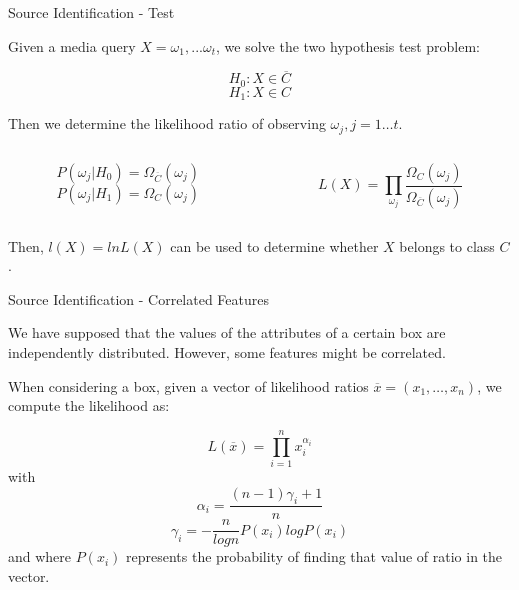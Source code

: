 \begin{tframe}{Source Identification - Test}

Given a media query $X = \omega_{1}, . . . \omega_{t}$, we solve the two hypothesis test problem:

$$  H_{0}:X \in \overline{C} $$
$$  H_{1}:X \in C $$

Then we determine the likelihood ratio of observing $\omega_{j}, j = 1 \ldots t$.

\vspace{1cm}

\begin{minipage}{\textwidth}
\begin{columns}[T]

\begin{column}{0.45\textwidth}
$$ P(\omega_{j}\vert H_{0}) = \Omega_{\overline{C}}(\omega_{j}) $$
$$ P(\omega_{j}\vert H_{1}) = \Omega_{C}(\omega_{j}) $$ 
\end{column}

\begin{column}{0.45\textwidth}
$$ L(X) = \prod\limits_{\omega_{j}}\dfrac{\Omega_{C}(\omega_{j}) }{\Omega_{\overline{C}}(\omega_{j})} $$
\end{column}

\end{columns}
\end{minipage}

\vspace{0.5cm}

Then, $l(X) = lnL(X)$ can be used to determine whether $X$ belongs to class $C$.

\end{tframe}

\begin{tframe}{Source Identification - Correlated Features}

We have supposed that the values of the attributes of a certain box are independently distributed. However, some features might be correlated.

\vspace{0.1cm}

When considering a box, given a vector of likelihood ratios $\overline{x} = (x_{1},\ldots,x_{n})$, we compute the likelihood as:

$$ L(\overline{x}) = \prod\limits_{i=1}^{n} x_{i}^{\alpha_{i}} $$ with $$ \alpha_{i} = \dfrac{(n-1)\gamma_{i}+1}{n} $$ $$ \gamma_{i} = - \dfrac{n}{log n} P(x_{i})log P(x_{i}) $$ and where $P(x_{i})$ represents the probability of finding that value of ratio in the vector.

\end{tframe}

